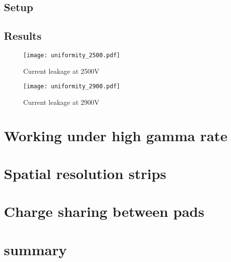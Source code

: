 \subsection{Setup}

\subsection{Results}

\begin{figure}[h]
	\centering
	\texttt{[image: uniformity\_2500.pdf]}
	\caption{Current leakage at 2500V}\label{fig:2500V}
	\vspace{4mm}
	\texttt{[image: uniformity\_2900.pdf]}
	\caption{Current leakage at 2900V}\label{fig:2900V}
\end{figure}


\section{Working under high gamma rate}

\section{Spatial resolution strips}

\section{Charge sharing between pads}

\section{summary}

